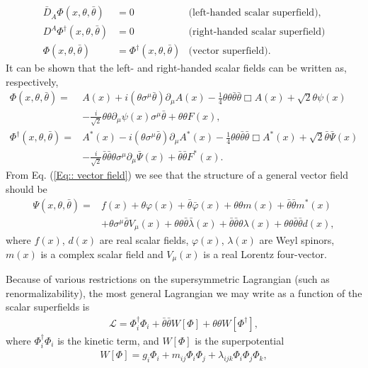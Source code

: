 \documentclass[twoside,english]{uiofysmaster}
\begin{document}
\begin{align}
\bar{D}_{\dot{A}} \Phi (x, \theta, \bar{\theta}) &= 0 &\text{(left-handed scalar superfield)},\\
D^A \Phi^{\dagger} (x, \theta, \bar{\theta}) &= 0 &\text{(right-handed scalar superfield)}\\
\Phi (x, \theta, \bar{\theta}) &= \Phi^{\dagger} (x, \theta, \bar{\theta}) &\text{(vector superfield)}.\label{Eq:: vector field}
\end{align}
It can be shown that the left- and right-handed scalar fields can be written as, respectively,
\begin{align}
\Phi (x, \theta, \bar{\theta}) =& A(x) + i (\theta \sigma^{\mu} \bar{\theta}) \partial_{\mu} A(x) - \frac{1}{4} \theta \theta \bar{\theta} \bar{\theta} \Box A(x) + \sqrt{2} \theta \psi (x)\\
& - \frac{i}{\sqrt{2}} \theta \theta \partial_{\mu} \psi (x) \sigma^{\mu} \bar{\theta} + \theta \theta F(x),\\
\Phi^{\dagger} (x, \theta, \bar{\theta}) =& A^*(x) - i (\theta \sigma^{\mu} \bar{\theta}) \partial_{\mu} A^*(x) - \frac{1}{4} \theta \theta \bar{\theta} \bar{\theta} \Box A^*(x) + \sqrt{2} \bar{\theta} \bar{\Psi} (x)\\
& - \frac{i}{\sqrt{2}} \bar{\theta} \bar{\theta} \theta \sigma^{\mu} \partial_{\mu} \bar{\Psi} (x)  + \bar{\theta} \bar{\theta} F^*(x).
\end{align}
From Eq. (\ref{Eq:: vector field}) we see that the structure of a general vector field should be
\begin{align}
\Psi (x, \theta, \bar{\theta}) =& f(x) + \theta \varphi (x) + \bar{\theta} \bar{\varphi} (x) + \theta \theta m(x) + \bar{\theta} \bar{\theta} m^* (x)\\
&+ \theta \sigma^{\mu} \bar{\theta} V_{\mu} (x) + \theta \theta \bar{\theta} \bar{\lambda} (x) + \bar{\theta} \bar{\theta} \theta \lambda (x) + \theta \theta \bar{\theta} \bar{\theta} d(x),
\end{align}
where $f(x)$, $d(x)$ are real scalar fields, $\varphi (x)$, $\lambda (x)$ are Weyl spinors, $m(x)$ is a complex scalar field and $V_{\mu} (x)$ is a real Lorentz four-vector.

Because of various restrictions on the supersymmetric Lagrangian (such as renormalizability), the most general Lagrangian we may write as a function of the scalar superfields is
\begin{align}
\mathcal{L} = \Phi_i^{\dagger} \Phi_i + \bar{\theta} \bar{\theta} W[\Phi] + \theta \theta W[\Phi^{\dagger}],
\end{align}
where $\Phi_i^{\dagger} \Phi_i$ is the kinetic term, and $W[\Phi]$ is the superpotential
\begin{align}\label{Eq:: superpotential}
W[\Phi] = g_i \Phi_i + m_{ij} \Phi_i \Phi_j + \lambda_{ijk} \Phi_i \Phi_j \Phi_k,
\end{align}
\end{document}
